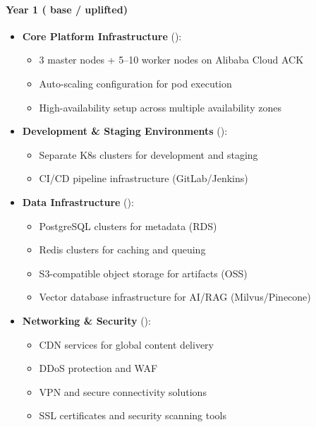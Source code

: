 \documentclass[11pt, a4paper, oneside]{article}
\begin{document}
\paragraph{Year 1 ( base /  uplifted)}

\begin{itemize}
    \item \textbf{Core Platform Infrastructure} ():
    \begin{itemize}
        \item 3 master nodes + 5--10 worker nodes on Alibaba Cloud ACK
        \item Auto-scaling configuration for pod execution
        \item High-availability setup across multiple availability zones
    \end{itemize}
    
    \item \textbf{Development \& Staging Environments} ():
    \begin{itemize}
        \item Separate K8s clusters for development and staging
        \item CI/CD pipeline infrastructure (GitLab/Jenkins)
    \end{itemize}
    
    \item \textbf{Data Infrastructure} ():
    \begin{itemize}
        \item PostgreSQL clusters for metadata (RDS)
        \item Redis clusters for caching and queuing
        \item S3-compatible object storage for artifacts (OSS)
        \item Vector database infrastructure for AI/RAG (Milvus/Pinecone)
    \end{itemize}
    
    \item \textbf{Networking \& Security} ():
    \begin{itemize}
        \item CDN services for global content delivery
        \item DDoS protection and WAF
        \item VPN and secure connectivity solutions
        \item SSL certificates and security scanning tools
    \end{itemize}
    

\end{itemize}
\end{document}
